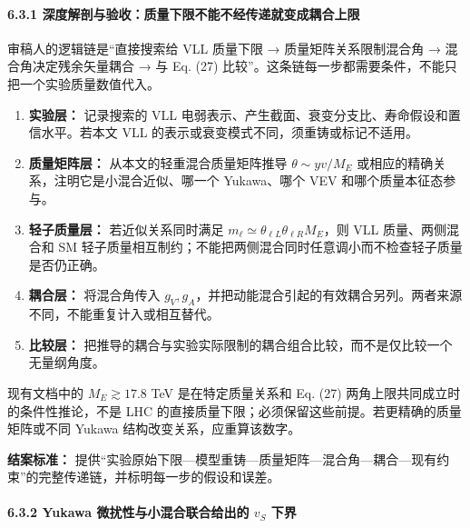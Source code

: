 \documentclass[
  chinese,
  UTF8]{ctexart}
\providecommand{\tightlist}{%
  \setlength{\itemsep}{0pt}\setlength{\parskip}{0pt}}
\begin{document}
\paragraph{6.3.1
深度解剖与验收：质量下限不能不经传递就变成耦合上限}\label{ux6df1ux5ea6ux89e3ux5256ux4e0eux9a8cux6536ux8d28ux91cfux4e0bux9650ux4e0dux80fdux4e0dux7ecfux4f20ux9012ux5c31ux53d8ux6210ux8026ux5408ux4e0aux9650}

审稿人的逻辑链是``直接搜索给 VLL 质量下限 → 质量矩阵关系限制混合角 →
混合角决定残余矢量耦合 → 与 Eq. (27)
比较''。这条链每一步都需要条件，不能只把一个实验质量数值代入。

\begin{enumerate}
\def\labelenumi{\arabic{enumi}.}
\tightlist
\item
  \textbf{实验层：} 记录搜索的 VLL
  电弱表示、产生截面、衰变分支比、寿命假设和置信水平。若本文 VLL
  的表示或衰变模式不同，须重铸或标记不适用。
\item
  \textbf{质量矩阵层：} 从本文的轻重混合质量矩阵推导
  \(\theta\sim yv/M_E\) 或相应的精确关系，注明它是小混合近似、哪一个
  Yukawa、哪个 VEV 和哪个质量本征态参与。
\item
  \textbf{轻子质量层：} 若近似关系同时满足
  \(m_\ell\simeq\theta_{\ell L}\theta_{\ell R}M_E\)，则 VLL
  质量、两侧混合和 SM
  轻子质量相互制约；不能把两侧混合同时任意调小而不检查轻子质量是否仍正确。
\item
  \textbf{耦合层：} 将混合角传入
  \(g_V,g_A\)，并把动能混合引起的有效耦合另列。两者来源不同，不能重复计入或相互替代。
\item
  \textbf{比较层：}
  把推导的耦合与实验实际限制的耦合组合比较，而不是仅比较一个无量纲角度。
\end{enumerate}

现有文档中的 \(M_E\gtrsim17.8\) TeV 是在特定质量关系和 Eq. (27)
两角上限共同成立时的条件性推论，不是 LHC
的直接质量下限；必须保留这些前提。若更精确的质量矩阵或不同 Yukawa
结构改变关系，应重算该数字。

\textbf{结案标准：}
提供``实验原始下限---模型重铸---质量矩阵---混合角---耦合---现有约束''的完整传递链，并标明每一步的假设和误差。

\paragraph{\texorpdfstring{6.3.2 Yukawa 微扰性与小混合联合给出的 \(v_S\)
下界}{6.3.2 Yukawa 微扰性与小混合联合给出的 v\_S 下界}}\label{yukawa-ux5faeux6270ux6027ux4e0eux5c0fux6df7ux5408ux8054ux5408ux7ed9ux51faux7684-v_s-ux4e0bux754c}
\end{document}
